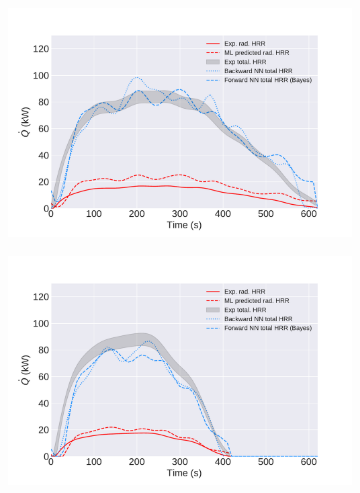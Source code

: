 \documentclass{article}
\begin{document}
\begin{figure}[htbp]
  \centering
  \begin{subfigure}[t]{.45\textwidth}
      \centering
      \includegraphics[width=\textwidth,keepaspectratio]{figures/meth_22in_1_final.pdf}
      \caption{}
      \label{fig:meth_22in_1}
  \end{subfigure}
  \begin{subfigure}[t]{.45\textwidth}
      \centering
      \includegraphics[width=\textwidth ,keepaspectratio]{figures/meth_22in_2_final.pdf}
      \caption{}
      \label{fig:meth_22in_2}
  \end{subfigure}
  \caption{} 
  \label{fig:meth_fires}
\end{figure}
\clearpage




\end{document}
